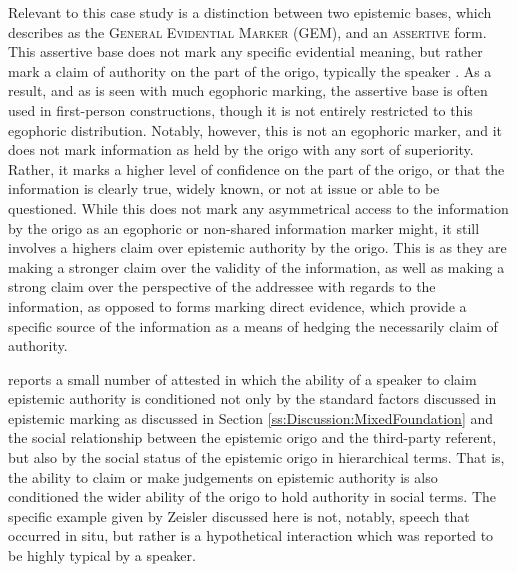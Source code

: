 Relevant to this case study is a distinction between two epistemic bases, which  describes as the \textsc{General Evidential Marker} (GEM), and an \textsc{assertive} form. This assertive base does not mark any specific evidential meaning, but rather mark a claim of authority on the part of the origo, typically the speaker \cite{Zeisler2018a}. As a result, and as is seen with much egophoric marking, the assertive base is often used in first-person constructions, though it is not entirely restricted to this egophoric distribution. Notably, however, this is not an egophoric marker, and it does not mark information as held by the origo with any sort of superiority. Rather, it marks a higher level of confidence on the part of the origo, or that the information is clearly true, widely known, or not at issue or able to be questioned. While this does not mark any asymmetrical access to the information by the origo as an egophoric or non-shared information marker might, it still involves a highers claim over epistemic authority by the origo. This is as they are making a stronger claim over the validity of the information, as well as making a strong claim over the perspective of the addressee with regards to the information, as opposed to forms marking direct evidence, which provide a specific source of the information as a means of hedging the necessarily claim of authority.

 reports a small number of attested in which the ability of a speaker to claim epistemic authority is conditioned not only by the standard factors discussed in epistemic marking as discussed in Section \ref{ss:Discussion:MixedFoundation} and the social relationship between the epistemic origo and the third-party referent, but also by the social status of the epistemic origo in hierarchical terms. That is, the ability to claim or make judgements on epistemic authority is also conditioned the wider ability of the origo to hold authority in social terms. The specific example given by Zeisler discussed here is not, notably, speech that occurred in situ, but rather is a hypothetical interaction which was reported to be highly typical by a speaker.

